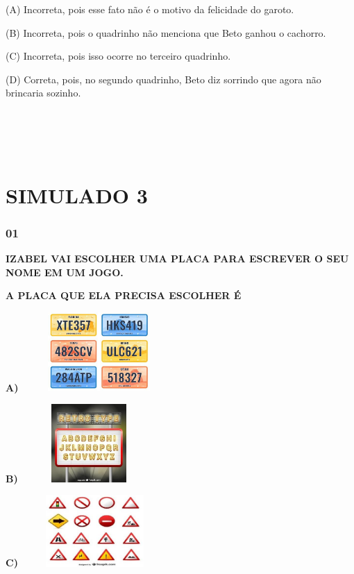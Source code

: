 (A) Incorreta, pois esse fato não é o motivo da felicidade do garoto.

(B) Incorreta, pois o quadrinho não menciona que Beto ganhou o cachorro.

(C) Incorreta, pois isso ocorre no terceiro quadrinho.

(D) Correta, pois, no segundo quadrinho, Beto diz sorrindo que agora não brincaria sozinho.

\protect\hypertarget{_heading=h.1mrcu09}{}{}

\section{\texorpdfstring{\\
}{ }}\label{section-56}

\section{SIMULADO 3}\label{simulado-3}

\subsubsection{01}\label{section-57}

\textbf{IZABEL VAI ESCOLHER UMA PLACA PARA ESCREVER O SEU NOME EM UM
JOGO.}

\textbf{A PLACA QUE ELA PRECISA ESCOLHER É }

\textbf{A)}
\includegraphics[width=2.32569in,height=1.18472in]{media/image222.jpg}

\textbf{B)}
\includegraphics[width=2.03125in,height=1.17361in]{media/image223.jpg}

\textbf{C)}
\includegraphics[width=2.20764in,height=1.07569in]{media/image224.jpg}

